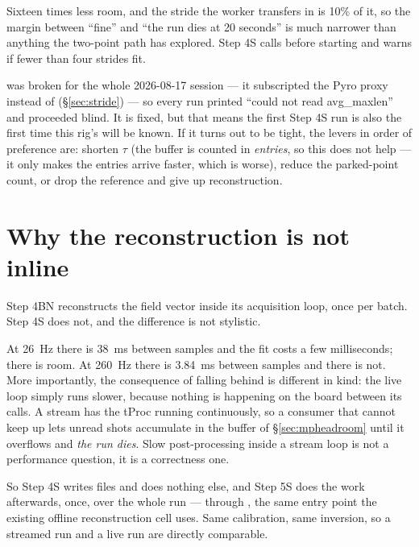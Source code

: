 Sixteen times less room, and the stride the worker transfers in is 10\% of it, so
the margin between ``fine'' and ``the run dies at 20 seconds'' is much narrower
than anything the two-point path has explored. Step 4S calls
 before starting and warns if fewer than four strides fit.

\begin{openbox}
 was broken for the whole 2026-08-17 session --- it
subscripted the Pyro proxy instead of  (\S\ref{sec:stride}) --- so
every run printed ``could not read avg_maxlen'' and proceeded blind. It is fixed,
but that means the first Step 4S run is also the first time this rig's
 will be known. If it turns out to be tight, the levers in order of
preference are: shorten $\tau$ (the buffer is counted in \emph{entries}, so this
does not help --- it only makes the entries arrive faster, which is worse), reduce
the parked-point count, or drop the reference and give up reconstruction.
\end{openbox}

\section{Why the reconstruction is not inline}
\label{sec:mprecon}

Step 4BN reconstructs the field vector inside its acquisition loop, once per
batch. Step 4S does not, and the difference is not stylistic.

At \SI{26}{\hertz} there is \SI{38}{\milli\second} between samples and the fit
costs a few milliseconds; there is room. At \SI{260}{\hertz} there is
\SI{3.84}{\milli\second} between samples and there is not. More importantly, the
consequence of falling behind is different in kind: the live loop simply runs
slower, because nothing is happening on the board between its 
calls. A stream has the tProc running continuously, so a consumer that cannot keep
up lets unread shots accumulate in the buffer of \S\ref{sec:mpheadroom} until it
overflows and \emph{the run dies}. Slow post-processing inside a stream loop is
not a performance question, it is a correctness one.

So Step 4S writes files and does nothing else, and Step 5S does the work
afterwards, once, over the whole run --- through
, the same entry point the existing
offline reconstruction cell uses. Same calibration, same inversion, so a streamed
run and a live run are directly comparable.

